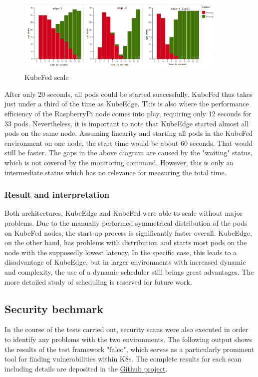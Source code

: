 \documentclass[MSC,Master,english]{twbook}%
\begin{document}
\begin{center}
    \begin{figure}[ht]
        \centering
        \includegraphics[width=0.9\textwidth]{PICs/kubefed-scale-100.png}
        \caption{KubeFed scale}
        \label{fig:kubefed-scale}
    \end{figure}
\end{center}
\par
After only 20 seconds, all pods could be started successfully. KubeFed thus takes just under a third of the time as KubeEdge. This is also where the performance efficiency of the RaspberryPi node comes into play, requiring only 12 seconds for 33 pods. Nevertheless, it is important to note that KubeEdge started almost all pods on the same node. Assuming linearity and starting all pods in the KubeFed environment on one node, the start time would be about 60 seconds. That would still be faster. The gaps in the above diagram are caused by the "waiting" status, which is not covered by the monitoring command. However, this is only an intermediate status which has no relevance for measuring the total time.

\subsubsection{Result and interpretation} 
Both architectures, KubeEdge and KubeFed were able to scale without major problems. Due to the manually performed symmetrical distribution of the pods on KubeFed nodes, the start-up process is significantly faster overall. KubeEdge, on the other hand, has problems with distribution and starts most pods on the node with the supposedly lowest latency. In the specific case, this leads to a disadvantage of KubeEdge, but in larger environments with increased dynamic and complexity, the use of a dynamic scheduler still brings great advantages. The more detailed study of scheduling is reserved for future work.

\subsection{Security bechmark}
\label{sec:dsrusecasesec}
In the course of the tests carried out, security scans were also executed in order to identify any problems with the two environments. The following output shows the results of the test framework "falco"\cite{falco-scan}, which serves as a particularly prominent tool for finding vulnerabilities within \ac{K8s}. The complete results for each scan including details are deposited in the \hyperref{https://github.com/Berndinox/K8sEdge/tree/main/Tests/it-security}{}{}{Github project}\cite{gh-bk-ke-bench}\cite{gh-bk-kf-bench}.
\end{document}
